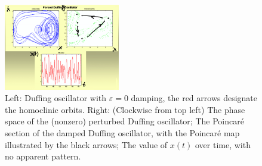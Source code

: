 \begin{ex}
\begin{figure}[h!]
	\includegraphics[width=0.45\textwidth]{figures/ch6/2pert_duffing.png}
	\caption{Left: Duffing oscillator with $\varepsilon=0$ damping, the red arrows designate the homoclinic orbits. Right: (Clockwise from top left) The phase space of the (nonzero) perturbed Duffing oscillator; The Poincaré section of the damped Duffing oscillator, with the Poincaré map illustrated by the black arrows; The value of $x(t)$ over time, with no apparent pattern.}
	\label{fig:pert_duffing}
\end{figure}

\end{ex}

